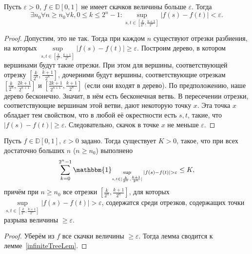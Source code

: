 \documentclass[12pt, a4paper, titlepage]{article}
\begin{document}
\begin{lem}\label{infiniteTreeLem}
 Пусть $\varepsilon>0$, $f\in \mathbb{D}[0,1]$ не имеет скачков величины больше $\varepsilon.$
 Тогда 
 $$\exists n_0 \forall n\ge n_0 \forall k, 0\le k \le 2^n-1 \colon 
 \sup\limits_{s,t \in [\frac{k}{2^n}, \frac{k+1}{2^n}]} |f(s)-f(t)|<\varepsilon.$$ 
\end{lem}
\begin{proof}
 Допустим, это не так. Тогда при каждом $n$ существуют отрезки разбиения,
 на которых $\sup\limits_{s,t \in [\frac{k}{2^n}, \frac{k+1}{2^n}]} |f(s)-f(t)| \ge \varepsilon.$
 Построим дерево, в котором вершинами будут такие отрезки. 
 При этом для вершины, соответствующей отрезку $[\frac{k}{2^n}, \frac{k+1}{2^n}]$,
 дочерними будут вершины, соответствующие отрезкам 
 $[\frac{k}{2^n}, \frac{2k+1}{2^{n+1}}]$ и
 $[\frac{2k+1}{2^{n+1}}, \frac{k+1}{2^n}]$ (если они входят в дерево).
 По предположению, наше дерево бесконечно. Значит, в нём есть бесконечная ветвь.
 В пересечении отрезки, соответствующие вершинам этой ветви, дают некоторую точку $x$. 
 Эта точка $x$ обладает тем свойством, что в любой её окрестности есть $s,t$, такие, что
 $|f(s)-f(t)| \ge \varepsilon$. Следовательно, скачок в точке $x$ не меньше $\varepsilon.$ 
\end{proof}

\begin{lem}\label{boundedJumpsNumberLem}
 Пусть $f\in \mathbb{D}[0,1]$, $\varepsilon>0$ задано. Тогда существует $K>0$, такое, что
 при всех достаточно больших $n$ ($n \ge n_0$) выполнено
 $$\sum\limits_{k=0}^{2^n-1}\mathbbm{1}_{\sup\limits_{s,t \in [\frac{k}{2^n}, \frac{k+1}{2^n}]}
|f(s)-f(t)|>\varepsilon} \le K,$$
причём при $n \ge n_0$ все отрезки $[\frac{k}{2^n}, \frac{k+1}{2^n}]$, для которых 
$\sup\limits_{s,t \in [\frac{k}{2^n}, \frac{k+1}{2^n}]}|f(s)-f(t)|>\varepsilon$,
содержатся среди отрезков, содержащих точки разрыва величины $\ge \varepsilon.$
\end{lem}
\begin{proof}
 Уберём из $f$ все скачки величины $\ge \varepsilon.$ Тогда лемма сводится к лемме~\ref{infiniteTreeLem}.
\end{proof}
\end{document}
